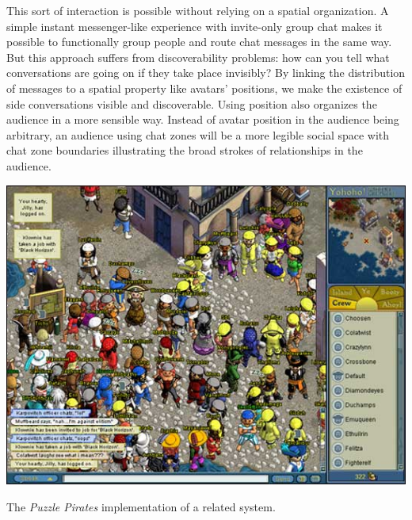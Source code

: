 This sort of interaction is possible without relying on a spatial organization. A simple instant messenger-like experience with invite-only group chat makes it possible to functionally group people and route chat messages in the same way. But this approach suffers from discoverability problems: how can you tell what conversations are going on if they take place invisibly? By linking the distribution of messages to a spatial property like avatars' positions, we make the existence of side conversations visible and discoverable. Using position also organizes the audience in a more sensible way. Instead of avatar position in the audience being arbitrary, an audience using chat zones will be a more legible social space with chat zone boundaries illustrating the broad strokes of relationships in the audience. 


\begin{marginfigure}
	\includegraphics{figures/pp_circles_chat.jpeg}
	\caption{The \emph{Puzzle Pirates} implementation of a related system.}
	\label{fig:pp_chat_circles}
\end{marginfigure}

